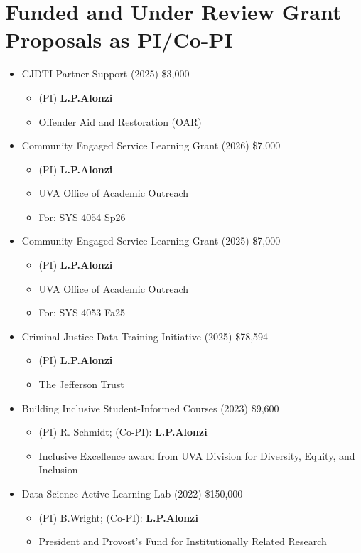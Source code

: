 \documentclass[10pt]{article}
\begin{document}
\section*{Funded and Under Review Grant Proposals as PI/Co-PI}
\begin{itemize}
\item CJDTI Partner Support (2025) \$3,000
\begin{itemize}
\item (PI) {\bf L.P.Alonzi}
\item Offender Aid and Restoration (OAR)
\end{itemize}
\item Community Engaged Service Learning Grant (2026) \$7,000
\begin{itemize}
\item (PI) {\bf L.P.Alonzi}
\item UVA Office of Academic Outreach
\item For: SYS 4054 Sp26
\end{itemize}
\item Community Engaged Service Learning Grant (2025) \$7,000
\begin{itemize}
\item (PI) {\bf L.P.Alonzi}
\item UVA Office of Academic Outreach
\item For: SYS 4053 Fa25
\end{itemize}
\item Criminal Justice Data Training Initiative (2025) \$78,594
\begin{itemize}
\item (PI) {\bf L.P.Alonzi}
\item The Jefferson Trust
\end{itemize}
\item Building Inclusive Student-Informed Courses (2023) \$9,600
\begin{itemize}
\item (PI) R. Schmidt; (Co-PI): {\bf L.P.Alonzi}
\item Inclusive Excellence award from UVA Division for Diversity, Equity, and Inclusion
\end{itemize}
\item Data Science Active Learning Lab (2022) \$150,000
\begin{itemize}
\item (PI) B.Wright; (Co-PI): {\bf L.P.Alonzi}
\item President and Provost’s Fund for Institutionally Related Research
\end{itemize}

\end{itemize}
\end{document}
